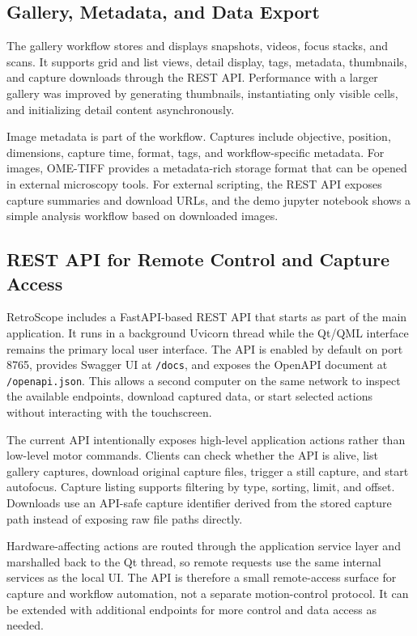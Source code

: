 \subsection{Gallery, Metadata, and Data Export}

The gallery workflow stores and displays snapshots, videos, focus stacks, and scans. It supports grid and list views, detail display, tags, metadata, thumbnails, and capture downloads through the REST API. Performance with a larger gallery was improved by generating thumbnails, instantiating only visible cells, and initializing detail content asynchronously.

Image metadata is part of the workflow. Captures include objective, position, dimensions, capture time, format, tags, and workflow-specific metadata. For images, OME-TIFF provides a metadata-rich storage format that can be opened in external microscopy tools. For external scripting, the REST API exposes capture summaries and download URLs, and the demo jupyter notebook shows a simple analysis workflow based on downloaded images.

\subsection{REST API for Remote Control and Capture Access}

RetroScope includes a FastAPI-based REST API that starts as part of the main application. It runs in a background Uvicorn thread while the Qt/QML interface remains the primary local user interface. The API is enabled by default on port 8765, provides Swagger UI at \texttt{/docs}, and exposes the OpenAPI document at \texttt{/openapi.json}. This allows a second computer on the same network to inspect the available endpoints, download captured data, or start selected actions without interacting with the touchscreen.

The current API intentionally exposes high-level application actions rather than low-level motor commands. Clients can check whether the API is alive, list gallery captures, download original capture files, trigger a still capture, and start autofocus. Capture listing supports filtering by type, sorting, limit, and offset. Downloads use an API-safe capture identifier derived from the stored capture path instead of exposing raw file paths directly.

Hardware-affecting actions are routed through the application service layer and marshalled back to the Qt thread, so remote requests use the same internal services as the local UI. The API is therefore a small remote-access surface for capture and workflow automation, not a separate motion-control
protocol. It can be extended with additional endpoints for more control and data access as needed.

